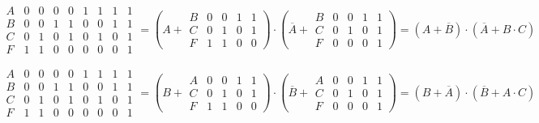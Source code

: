 \documentclass[a4paper,10pt]{article} %
\begin{document}
	\begin{equation}
		\begin{smallmatrix}
			A & 0 & 0 & 0 & 0 & 1 & 1 & 1 & 1 \\
			B & 0 & 0 & 1 & 1 & 0 & 0 & 1 & 1 \\
			C & 0 & 1 & 0 & 1 & 0 & 1 & 0 & 1 \\
			F & 1 & 1 & 0 & 0 & 0 & 0 & 0 & 1
		\end{smallmatrix}
		= \left(A + 
		\begin{smallmatrix}
			B & 0 & 0 & 1 & 1 \\
			C & 0 & 1 & 0 & 1 \\
			F & 1 & 1 & 0 & 0
		\end{smallmatrix}
		\right) \cdot \left( \overline{A} + 
		\begin{smallmatrix}
			B & 0 & 0 & 1 & 1 \\
			C & 0 & 1 & 0 & 1 \\
			F & 0 & 0 & 0 & 1
		\end{smallmatrix}
		\right) = (A + \overline{B}) \cdot (\overline{A} + B \cdot C)
	\end{equation}
	
	\begin{equation}
		\begin{smallmatrix}
			A & 0 & 0 & 0 & 0 & 1 & 1 & 1 & 1 \\
			B & 0 & 0 & 1 & 1 & 0 & 0 & 1 & 1 \\
			C & 0 & 1 & 0 & 1 & 0 & 1 & 0 & 1 \\
			F & 1 & 1 & 0 & 0 & 0 & 0 & 0 & 1
		\end{smallmatrix}
		= \left(B + 
		\begin{smallmatrix}
			A & 0 & 0 & 1 & 1 \\
			C & 0 & 1 & 0 & 1 \\
			F & 1 & 1 & 0 & 0
		\end{smallmatrix}
		\right) \cdot \left(\overline{B} + 
		\begin{smallmatrix}
			A & 0 & 0 & 1 & 1 \\
			C & 0 & 1 & 0 & 1 \\
			F & 0 & 0 & 0 & 1
		\end{smallmatrix}  
		\right) = (B + \overline{A}) \cdot (\overline{B} + A \cdot C)
	\end{equation}
	
\end{document}
